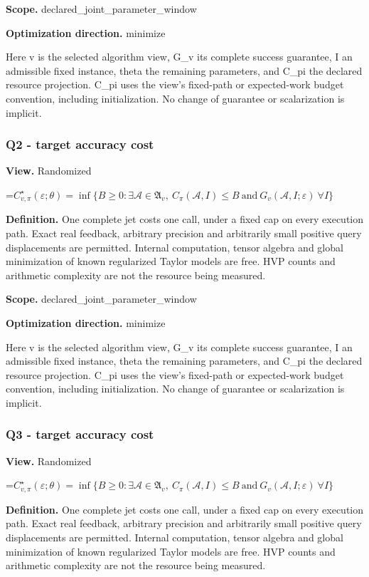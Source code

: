 \documentclass[10pt,a4paper]{article}
\newcommand{\AtlasMath}[1]{\par\begingroup\centering\setbox0=\hbox{$\displaystyle #1$}\ifdim\wd0>1.4\linewidth\typeout{ATLAS WIDE FORMULA: \the\wd0}\fi\ifdim\wd0>\linewidth\resizebox{\linewidth}{!}{\box0}\else\box0\fi\par\endgroup}
\begin{document}
\textbf{Scope.} declared\_joint\_parameter\_window

\textbf{Optimization direction.} minimize

Here v is the selected algorithm view, G\_v its complete success guarantee, I an admissible fixed instance, theta the remaining parameters, and C\_pi the declared resource projection. C\_pi uses the view's fixed-path or expected-work budget convention, including initialization. No change of guarantee or scalarization is implicit.

\subsubsection{Q2 - target accuracy cost}
\textbf{View.} Randomized

\AtlasMath{C^\star_{v,\pi}(\varepsilon;\theta)=\inf\{B\ge0:\exists\mathcal A\in\mathfrak A_v,\ C_\pi(\mathcal A,I)\le B\ \text{and}\ G_v(\mathcal A,I;\varepsilon)\ \forall I\}}
\textbf{Definition.} One complete jet costs one call, under a fixed cap on every execution path. Exact real feedback, arbitrary precision and arbitrarily small positive query displacements are permitted. Internal computation, tensor algebra and global minimization of known regularized Taylor models are free. HVP counts and arithmetic complexity are not the resource being measured.

\textbf{Scope.} declared\_joint\_parameter\_window

\textbf{Optimization direction.} minimize

Here v is the selected algorithm view, G\_v its complete success guarantee, I an admissible fixed instance, theta the remaining parameters, and C\_pi the declared resource projection. C\_pi uses the view's fixed-path or expected-work budget convention, including initialization. No change of guarantee or scalarization is implicit.

\subsubsection{Q3 - target accuracy cost}
\textbf{View.} Randomized

\AtlasMath{C^\star_{v,\pi}(\varepsilon;\theta)=\inf\{B\ge0:\exists\mathcal A\in\mathfrak A_v,\ C_\pi(\mathcal A,I)\le B\ \text{and}\ G_v(\mathcal A,I;\varepsilon)\ \forall I\}}
\textbf{Definition.} One complete jet costs one call, under a fixed cap on every execution path. Exact real feedback, arbitrary precision and arbitrarily small positive query displacements are permitted. Internal computation, tensor algebra and global minimization of known regularized Taylor models are free. HVP counts and arithmetic complexity are not the resource being measured.
\end{document}
